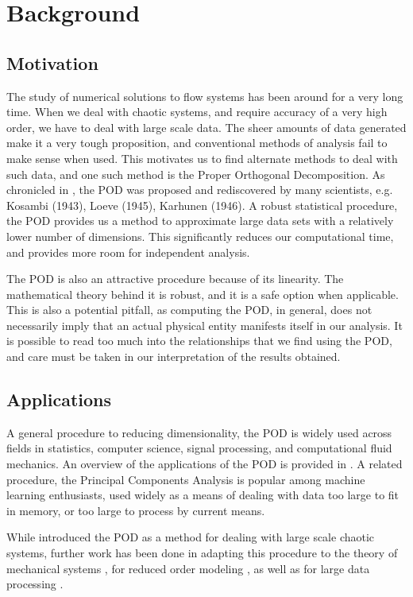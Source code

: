 \documentclass[submit]{aiaa-tc_mod}%
\begin{document}
\section{Background}
\subsection{Motivation}
The study of numerical solutions to flow systems has been around for a very long time. When we deal with chaotic systems, and require accuracy of a very high order, we have to deal with large scale data. The sheer amounts of data generated make it a very tough proposition, and conventional methods of analysis fail to make sense when used. This motivates us to find alternate methods to deal with such data, and one such method is the Proper Orthogonal Decomposition. As chronicled in \cite{sirovich}, the POD was proposed and rediscovered by many scientists, e.g. Kosambi (1943), Loeve (1945), Karhunen (1946). A robust statistical procedure, the POD provides us a method to approximate large data sets with a relatively lower number of dimensions. This significantly reduces our computational time, and provides more room for independent analysis. 

The POD is also an attractive procedure because of its linearity. The mathematical theory behind it is robust, and it is a safe option when applicable. This is also a potential pitfall, as computing the POD, in general, does not necessarily imply that an actual physical entity manifests itself in our analysis. It is possible to read too much into the relationships that we find using the POD, and care must be taken in our interpretation of the results obtained. 
\clearpage
\subsection{Applications}
A general procedure to reducing dimensionality, the POD is widely used across fields in statistics, computer science, signal processing, and computational fluid mechanics. An overview of the applications of the POD is provided in \cite{podintro}. A related procedure, the Principal Components Analysis \cite{googleintro} is popular among machine learning enthusiasts, used widely as a means of dealing with data too large to fit in memory, or too large to process by current means. 

While \cite{sirovich} introduced the POD as a method for dealing with large scale chaotic systems, further work has been done in adapting this procedure to the theory of mechanical systems \cite{belgium}, for reduced order modeling \cite{mit}, as well as for large data processing \cite{largedatasets}. 
\end{document}
